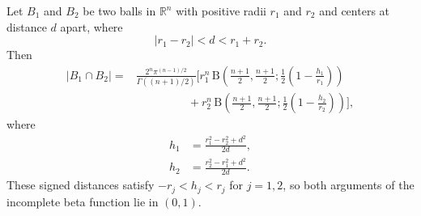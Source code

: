 \documentclass[12pt]{amsart}
\numberwithin{equation}{section}
\begin{document}
\begin{theorem}
Let $B_1$ and $B_2$ be two balls in $\mathbb{R}^n$ with positive radii
$r_1$ and $r_2$ and centers at distance $d$ apart, where
\begin{equation}
\label{condition}
|r_1-r_2|<d<r_1+r_2.
\end{equation}
Then
\begin{equation}
\label{vol_inter_two_balls}
\begin{aligned}
|B_1\cap B_2|
={}&\frac{2^n\pi^{(n-1)/2}}{\Gamma((n+1)/2)}
\Bigg[
 r_1^n\,\mathrm{B}\!\left(
 \frac{n+1}{2},\frac{n+1}{2};
 \frac12\left(1-\frac{h_1}{r_1}\right)\right)\\
&\hspace{55pt}{}+
 r_2^n\,\mathrm{B}\!\left(
 \frac{n+1}{2},\frac{n+1}{2};
 \frac12\left(1-\frac{h_2}{r_2}\right)\right)
\Bigg],
\end{aligned}
\end{equation}
where
\begin{align}
h_1&=\frac{r_1^2-r_2^2+d^2}{2d},\label{h_mu}\\
h_2&=\frac{r_2^2-r_1^2+d^2}{2d}.\label{h_r}
\end{align}
These signed distances satisfy $-r_j<h_j<r_j$ for $j=1,2$, so both
arguments of the incomplete beta function lie in $(0,1)$.
\end{theorem}
\end{document}
